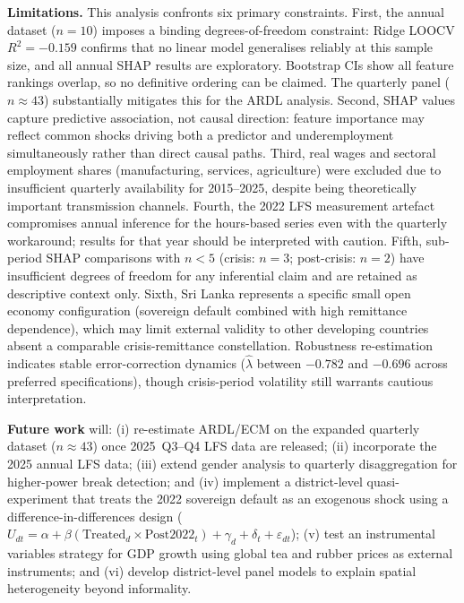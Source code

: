 \documentclass[sigconf]{acmart}
\begin{document}
\textbf{Limitations.}
This analysis confronts six primary constraints. First, the annual
dataset ($n{=}10$) imposes a binding degrees-of-freedom constraint:
Ridge LOOCV $R^2{=}{-}0.159$ confirms that no linear model generalises
reliably at this sample size, and all annual SHAP results are
exploratory. Bootstrap CIs show all feature rankings overlap, so no
definitive ordering can be claimed. The quarterly panel ($n{\approx}43$)
substantially mitigates this for the ARDL analysis. Second, SHAP values
capture predictive association, not causal direction: feature importance
may reflect common shocks driving both a predictor and underemployment
simultaneously rather than direct causal paths. Third, real wages and
sectoral employment shares (manufacturing, services, agriculture) were
excluded due to insufficient quarterly availability for 2015--2025,
despite being theoretically important transmission channels. Fourth, the
2022 LFS measurement artefact compromises annual inference for the
hours-based series even with the quarterly workaround; results for that
year should be interpreted with caution. Fifth, sub-period SHAP
comparisons with $n{<}5$ (crisis: $n{=}3$; post-crisis: $n{=}2$) have
insufficient degrees of freedom for any inferential claim and are
retained as descriptive context only. Sixth, Sri Lanka represents a
specific small open economy configuration (sovereign default combined
with high remittance dependence), which may limit external validity to
other developing countries absent a comparable crisis-remittance
constellation. Robustness re-estimation indicates stable error-correction
dynamics ($\hat\lambda$ between $-0.782$ and $-0.696$ across preferred
specifications), though crisis-period volatility still warrants cautious
interpretation.
 
\textbf{Future work} will: (i) re-estimate ARDL/ECM on the expanded
quarterly dataset ($n{\approx}43$) once 2025~Q3--Q4 LFS data are released;
(ii) incorporate the 2025 annual LFS data; (iii) extend gender analysis
to quarterly disaggregation for higher-power break detection; and
(iv) implement a district-level quasi-experiment that treats the 2022
sovereign default as an exogenous shock using a difference-in-differences
design ($U_{dt} = \alpha + \beta(\text{Treated}_d \times \text{Post2022}_t)
+ \gamma_d + \delta_t + \varepsilon_{dt}$); (v) test an instrumental
variables strategy for GDP growth using global tea and rubber prices as
external instruments; and (vi) develop district-level panel models to
explain spatial heterogeneity beyond informality.



\end{document}
